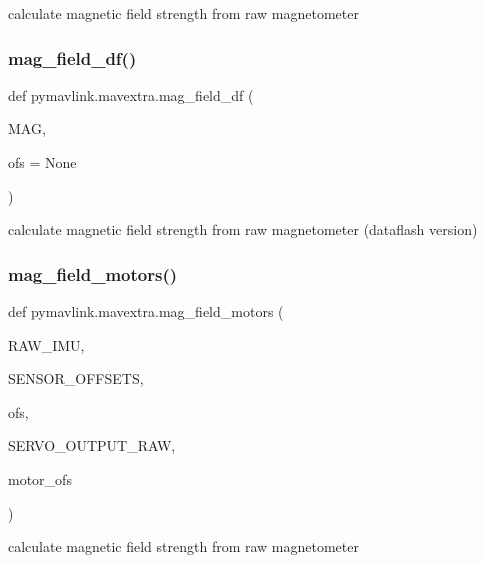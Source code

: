 \begin{DoxyVerb}calculate magnetic field strength from raw magnetometer\end{DoxyVerb}
 \mbox{\label{namespacepymavlink_1_1mavextra_a4bdc6d85f92efa62d773a8609aabaa32}} 
\subsubsection{\texorpdfstring{mag\+\_\+field\+\_\+df()}{mag\_field\_df()}}
{\footnotesize\ttfamily def pymavlink.\+mavextra.\+mag\+\_\+field\+\_\+df (\begin{DoxyParamCaption}\item[{}]{M\+AG,  }\item[{}]{ofs = {\ttfamily None} }\end{DoxyParamCaption})}

\begin{DoxyVerb}calculate magnetic field strength from raw magnetometer (dataflash version)\end{DoxyVerb}
 \mbox{\label{namespacepymavlink_1_1mavextra_afd8e63b1dd36777b854b99782f284831}} 
\subsubsection{\texorpdfstring{mag\+\_\+field\+\_\+motors()}{mag\_field\_motors()}}
{\footnotesize\ttfamily def pymavlink.\+mavextra.\+mag\+\_\+field\+\_\+motors (\begin{DoxyParamCaption}\item[{}]{R\+A\+W\+\_\+\+I\+MU,  }\item[{}]{S\+E\+N\+S\+O\+R\+\_\+\+O\+F\+F\+S\+E\+TS,  }\item[{}]{ofs,  }\item[{}]{S\+E\+R\+V\+O\+\_\+\+O\+U\+T\+P\+U\+T\+\_\+\+R\+AW,  }\item[{}]{motor\+\_\+ofs }\end{DoxyParamCaption})}

\begin{DoxyVerb}calculate magnetic field strength from raw magnetometer\end{DoxyVerb}
 \mbox{\label{namespacepymavlink_1_1mavextra_aa27cdc29ee82e3515eace9a8a98c331b}} 
